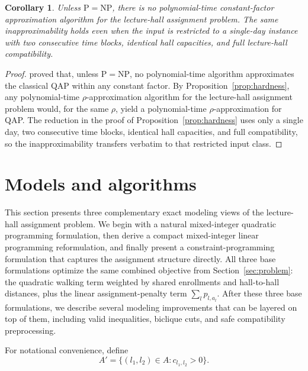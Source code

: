 \documentclass[11pt]{article}
\newtheorem{corollary}[theorem]{Corollary}
\begin{document}
\begin{corollary}
\label{cor:no-constant-approx}
Unless $\mathrm{P}=\mathrm{NP}$, there is no polynomial-time constant-factor approximation algorithm for the lecture-hall assignment problem. The same inapproximability holds even when the input is restricted to a single-day instance with two consecutive time blocks, identical hall capacities, and full lecture-hall compatibility.
\end{corollary}
\begin{proof}
\citet{sahni1976p} proved that, unless $\mathrm{P}=\mathrm{NP}$, no polynomial-time algorithm approximates the classical QAP within any constant factor. By Proposition~\ref{prop:hardness}, any polynomial-time $\rho$-approximation algorithm for the lecture-hall assignment problem would, for the same $\rho$, yield a polynomial-time $\rho$-approximation for QAP. The reduction in the proof of Proposition~\ref{prop:hardness} uses only a single day, two consecutive time blocks, identical hall capacities, and full compatibility, so the inapproximability transfers verbatim to that restricted input class.
\end{proof}


\section{Models and algorithms}
This section presents three complementary exact modeling views of the lecture-hall assignment problem. We begin with a natural mixed-integer quadratic programming formulation, then derive a compact mixed-integer linear programming reformulation, and finally present a constraint-programming formulation that captures the assignment structure directly. All three base formulations optimize the same combined objective from Section~\ref{sec:problem}: the quadratic walking term weighted by shared enrollments and hall-to-hall distances, plus the linear assignment-penalty term $\sum_l p_{l,a_l}$. After these three base formulations, we describe several modeling improvements that can be layered on top of them, including valid inequalities, biclique cuts, and safe compatibility preprocessing.

For notational convenience, define
\[
A' = \{(l_1,l_2) \in A : c_{l_1,l_2} > 0\}.
\]
\end{document}
